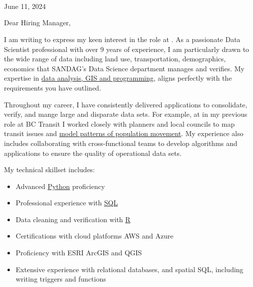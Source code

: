 \documentclass[letterpaper]{article}
\newcommand{\impt}[1]{\uline{#1}}
\begin{document}
\large
\JobManager \\
\JobManagerTitle \\
\textbf{\JobCompany} \\

\null\hfill June 11, 2024

Dear Hiring Manager,

I am writing to express my keen interest in the
\impt{\JobTitle} role at {\JobCompany}.
As a passionate Data Scientist professional with over 9 years of
experience, I am particularly drawn to the wide range of data
including land use, transportation, demographics, economics 
that SANDAG's Data Science department manages and verifies.
My expertise in \impt{data analysis, GIS and programming}, 
aligns perfectly with the requirements you have outlined.

Throughout my career, I have consistently delivered applications to
consolidate, verify, and mange large and disparate data sets.
For example, at in my previous role at BC Transit I worked closely with
planners and local councils to map transit issues and
\impt{model patterns of population movement}.
My experience also includes collaborating with cross-functional teams to
develop algorithms and applications to ensure the quality of operational data sets.

My technical skillset includes:
\vspace{-12pt}
\begin{itemize} \itemsep 0pt
\item Advanced \impt{Python} proficiency
\item Professional experience with \impt{SQL}
\item Data cleaning and verification with \impt{R}
\item Certifications with cloud platforms AWS and Azure
\item Proficiency with ESRI ArcGIS and QGIS
\item Extensive experience with relational databases, and spatial SQL, including writing triggers and functions
\end{itemize}
\end{document}

